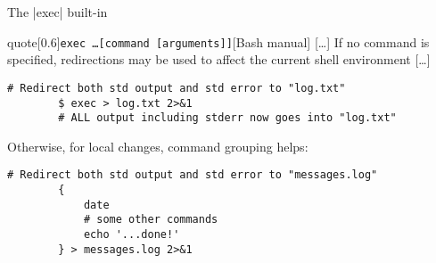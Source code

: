 \begin{frame}[fragile]{The \bash|exec| built-in}
    \vspace{-2mm}
    \begin{varblock}{quote}[0.6\textwidth]{\texttt{exec \ldots [command [arguments]]}}[Bash manual]
        [\ldots] If no command is specified, redirections may be used to affect the current shell environment [\ldots]\smallskip
    \end{varblock}
    \begin{lstlisting}[style=MyBash, numbers=none, belowskip=-4mm]
        # Redirect both std output and std error to "log.txt"
        $ exec > log.txt 2>&1
        # ALL output including stderr now goes into "log.txt"
    \end{lstlisting}
    Otherwise, for local changes, command grouping helps:
    \begin{lstlisting}[style=MyBash, numbers=none, aboveskip=2mm]
        # Redirect both std output and std error to "messages.log"
        {
            date
            # some other commands
            echo '...done!'
        } > messages.log 2>&1
    \end{lstlisting} 
\end{frame}
